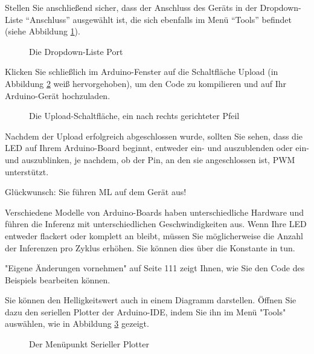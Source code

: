 Stellen Sie anschließend sicher, dass der Anschluss des Geräts in der Dropdown-Liste ``Anschluss'' ausgewählt ist, die sich ebenfalls im Menü ``Tools'' befindet (siehe Abbildung  \ref{fig:ArduSelectPort}).

\begin{figure}
    \centering
    
    \caption{Die Dropdown-Liste Port}\label{fig:ArduSelectPort}
\end{figure} 


Klicken Sie schließlich im Arduino-Fenster auf die Schaltfläche Upload (in Abbildung \ref{fig:ArduUpload} weiß hervorgehoben), um den Code zu kompilieren und auf Ihr Arduino-Gerät hochzuladen.

\begin{figure}
    \centering
    
    \caption{Die Upload-Schaltfläche, ein nach rechts gerichteter Pfeil}\label{fig:ArduUpload}
\end{figure} 


Nachdem der Upload erfolgreich abgeschlossen wurde, sollten Sie sehen, dass die LED auf Ihrem Arduino-Board beginnt, entweder ein- und auszublenden oder ein- und auszublinken, je nachdem, ob der Pin, an den sie angeschlossen ist, PWM unterstützt.

\medskip

Glückwunsch: Sie führen ML auf dem Gerät aus!

\medskip


Verschiedene Modelle von Arduino-Boards haben unterschiedliche Hardware und führen die Inferenz mit unterschiedlichen Geschwindigkeiten aus. Wenn Ihre LED entweder flackert oder komplett an bleibt, müssen Sie möglicherweise die Anzahl der Inferenzen pro Zyklus erhöhen. Sie können dies über die Konstante  in  tun.



 	"Eigene Änderungen vornehmen" auf Seite 111 zeigt Ihnen, wie Sie den Code des Beispiels bearbeiten können.


Sie können den Helligkeitswert auch in einem Diagramm darstellen. Öffnen Sie dazu den seriellen Plotter der Arduino-IDE, indem Sie ihn im Menü "Tools" auswählen, wie in Abbildung \ref{fig:ArduSerial} gezeigt.

\begin{figure}
    \centering
    
    \caption{Der Menüpunkt Serieller Plotter}\label{fig:ArduSerial}
\end{figure} 


